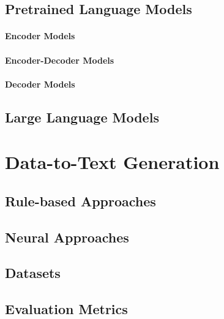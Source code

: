 \subsection{Pretrained Language Models}
\label{sec:plms}

\paragraph{Encoder Models}

\paragraph{Encoder-Decoder Models}

\paragraph{Decoder Models}

\subsection{Large Language Models}
\label{sec:llms}
\section{Data-to-Text Generation}
\label{sec:d2t}
\subsection{Rule-based Approaches}
\label{sec:rule-d2t}
\subsection{Neural Approaches}
\label{sec:neural-d2t}
\subsection{Datasets}
\label{sec:datasets}
\subsection{Evaluation Metrics}
\label{sec:evaluation}